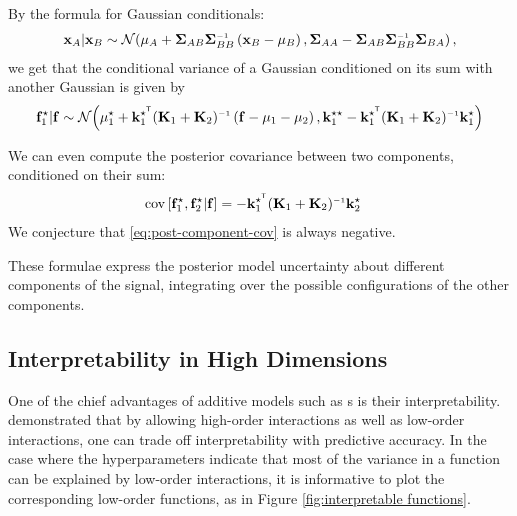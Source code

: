 By the formula for Gaussian conditionals:
\begin{align}
\vx_A | \vx_B \sim \Nt{\vmu_A + \vSigma_{AB} \vSigma_{BB}\inv \left( \vx_B - \vmu_B \right) }
{\vSigma_{AA} - \vSigma_{AB} \vSigma_{BB}\inv \vSigma_{BA} },
\end{align}
we get that the conditional variance of a Gaussian conditioned on its sum with another Gaussian is given by
\begin{align}
\vf_1^\star | \vf \sim \Nt{\vmu_1^\star + \vk_1^{\star\tra} (\vK_1 + \vK_2)\inv \left( \vf - \vmu_1 - \vmu_2 \right) } { \vk_1^{\star\star} - \vk_1^{\star\tra} (\vK_1 + \vK_2)\inv \vk_1^{\star}}
\end{align}

We can even compute the posterior covariance between two components, conditioned on their sum:
%
\begin{align}
\covargs{ \vf_1^\star}{\vf_2^\star | \vf } 
& = - \vk_1^{\star\tra} (\vK_1 + \vK_2)\inv \vk_2^\star
\label{eq:post-component-cov}
\end{align}
%
We conjecture that \ref{eq:post-component-cov} is always negative.

These formulae express the posterior model uncertainty about different components of the signal, integrating over the possible configurations of the other components.




\subsection{Interpretability in High Dimensions}
One of the chief advantages of additive models such as \GAM{}s is their interpretability.
\citet{plate1999accuracy} demonstrated that by allowing high-order interactions as well as low-order interactions, one can trade off interpretability with predictive accuracy.  In the case where the hyperparameters indicate that most of the variance in a function can be explained by low-order interactions, it is informative to plot the corresponding low-order functions, as in Figure \ref{fig:interpretable functions}. 



